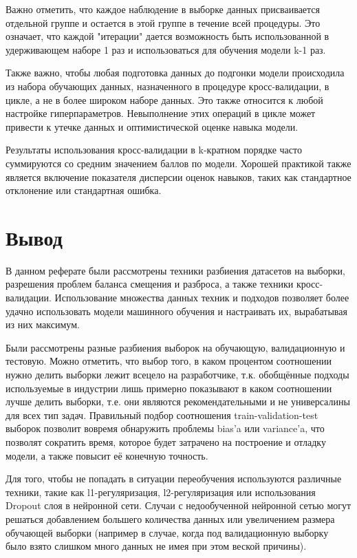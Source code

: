 Важно отметить, что каждое наблюдение в выборке данных присваивается отдельной группе и остается в этой группе в течение всей процедуры. Это означает, что каждой "итерации" дается возможность быть использованной в удерживающем наборе 1 раз и использоваться для обучения модели k-1 раз.

Также важно, чтобы любая подготовка данных до подгонки модели происходила из набора обучающих данных, назначенного в процедуре кросс-валидации, в цикле, а не в более широком наборе данных. Это также относится к любой настройке гиперпараметров. Невыполнение этих операций в цикле может привести к утечке данных и оптимистической оценке навыка модели.

Результаты использования кросс-валидации в k-кратном порядке часто суммируются со средним значением баллов по модели. Хорошей практикой также является включение показателя дисперсии оценок навыков, таких как стандартное отклонение или стандартная ошибка.

\section{Вывод}

В данном реферате были рассмотрены техники разбиения датасетов на выборки, разрешения проблем баланса смещения и разброса, а также техники кросс-валидации. Использование множества данных техник и подходов позволяет более удачно использовать модели машинного обучения и настраивать их, вырабатывая из них максимум.

Были рассмотрены разные разбиения выборок на обучающую, валидационную и тестовую. Можно отметить, что выбор того, в каком процентом соотношении нужно делить выборки лежит всецело на разработчике, т.к. обобщённые подходы используемые в индустрии лишь примерно показывают в каком соотношении лучше делить выборки, т.е. они являются рекомендательными и не универсалины для всех тип задач. Правильный подбор соотношения train-validation-test выборок позволит вовремя обнаружить проблемы bias'a или variance'a, что позволят сократить время, которое будет затрачено на построение и отладку модели, а также повысит её конечную точность.

Для того, чтобы не попадать в ситуации переобучения используются различные техники, такие как l1-регуляризация, l2-регуляризация или использования Dropout слоя в нейронной сети. Случаи с недообученной нейронной сетью могут решаться добавлением большего количества данных или увеличением размера обучающей выборки (например в случае, когда под валидационную выборку было взято слишком много данных не имея при этом веской причины).

